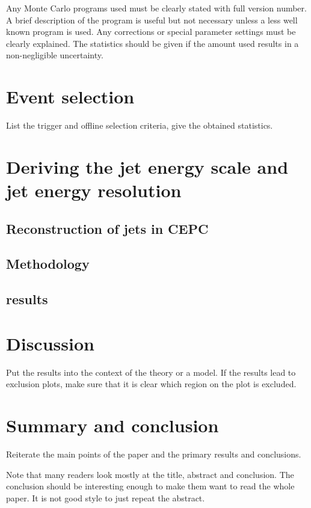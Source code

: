 \documentclass[11pt,a4paper]{cepcnote}
\begin{document}
Any Monte Carlo programs used must be clearly stated with full version
number. A brief description of the program is useful but not necessary
unless a less well known program is used.  Any corrections or special
parameter settings must be clearly explained.  The statistics should
be given if the amount used results in a non-negligible uncertainty.

\section{Event selection}

List the trigger and offline selection criteria, give the obtained
statistics.


\section{Deriving the jet energy scale and jet energy resolution}
\subsection{Reconstruction of jets in CEPC}
\subsection{Methodology}
\subsection{results}



\section{Discussion}

Put the results into the context of the theory or a model.
%
If the results lead to exclusion plots, make sure that it is clear
which region on the plot is excluded.

%
%
\section{Summary and conclusion}

Reiterate the main points of the paper and the primary results and
conclusions.

Note that many readers look mostly at the title, abstract and
conclusion. The conclusion should be interesting enough to
make them want to read the whole paper.
It is not good style to just repeat the abstract.
\end{document}
